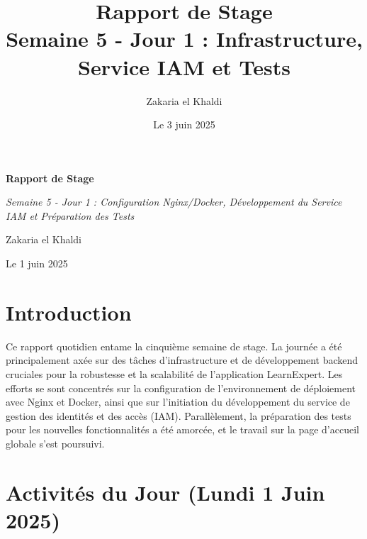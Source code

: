 \documentclass[12pt, a4paper]{article}
\title{\Huge\bfseries\color{primary} Rapport de Stage \\ 
      \Large Semaine 5 - Jour 1 : Infrastructure, Service IAM et Tests} %
\author{\Large Zakaria el Khaldi}
\date{\large Le 3 juin 2025} %
\begin{document}
\begin{titlepage}
  \centering
  {\Huge\bfseries\color{primary} Rapport de Stage \par}
  \vspace{1cm}
  {\Large\itshape Semaine 5 - Jour 1 : Configuration Nginx/Docker, Développement du Service IAM et Préparation des Tests\par} %
  \vspace{2cm}
  
  \vspace{2cm}
  {\Large Zakaria el Khaldi\par}
  \vfill
  {\large Le 1 juin 2025\par} %
\end{titlepage}

\tableofcontents
\thispagestyle{empty}
\newpage

\section{Introduction}
\thispagestyle{fancy}
Ce rapport quotidien entame la cinquième semaine de stage. La journée a été principalement axée sur des tâches d'infrastructure et de développement backend cruciales pour la robustesse et la scalabilité de l'application LearnExpert. Les efforts se sont concentrés sur la configuration de l'environnement de déploiement avec Nginx et Docker, ainsi que sur l'initiation du développement du service de gestion des identités et des accès (IAM). Parallèlement, la préparation des tests pour les nouvelles fonctionnalités a été amorcée, et le travail sur la page d'accueil globale s'est poursuivi.

\section{Activités du Jour (Lundi 1 Juin 2025)} %
\end{document}
